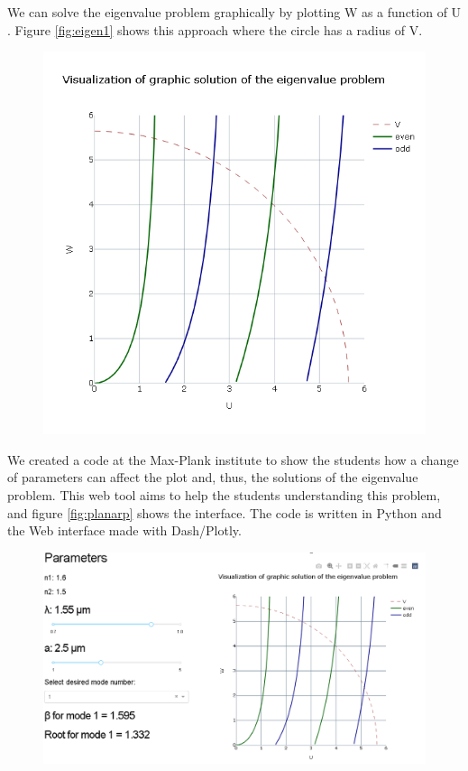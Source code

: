        We can solve the eigenvalue problem graphically by plotting W as a function of U \citep{yariv_b}. Figure \ref{fig:eigen1} shows this approach where the circle has a radius of V.
        
        
        \begin{figure}[label={fig:eigen1}, caption={Visualization of the graphic solution of the eigenvalue problem. Taken from \cite{herokuapp}}]
        	\includegraphics[width=.6\textwidth]{figures/chap2/Eigenvalue.png} 
        \end{figure}
        
        We created a code at the Max-Plank institute \cite{gitmax} to show the students how a change of parameters can affect the plot and, thus, the solutions of the eigenvalue problem. This web tool aims to help the students understanding this problem, and figure \ref{fig:planarp}  shows the interface. The code is written in Python and the Web interface made with Dash/Plotly.  
        
        \begin{figure}[label={fig:planarp}, caption={\href{https://fiber-mode-app.herokuapp.com/apps/dash_plot}{Heroku app} for the planar waveguide.}]
        	\includegraphics[width=.8\textwidth]{figures/chap2/planarpage.png} 
        \end{figure}
        
